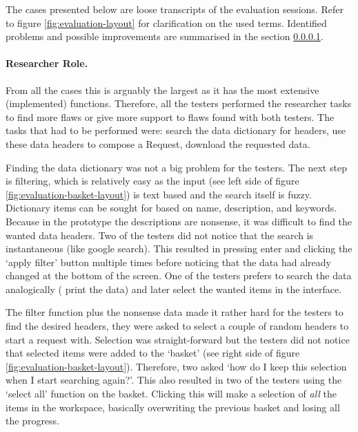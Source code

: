
The  cases presented below are loose transcripts of the evaluation sessions.
Refer to figure \ref{fig:evaluation-layout} for clarification on the used terms.
Identified problems and possible improvements are summarised in the  section \ref{}.

\paragraph{Researcher Role.}
From all the cases this is arguably the largest as it has the most extensive (implemented) functions.
Therefore, all the testers performed the researcher tasks to find more flaws or give more support to flaws found with both testers.
The tasks that had to be performed were: search the data dictionary for headers, use these data headers to compose a Request, download the requested data. 


Finding the data dictionary was not a big problem for the testers.
The next step is filtering, which is relatively easy as the input (see left side of figure \ref{fig:evaluation-basket-layout}) is text based and the search itself is fuzzy.
Dictionary items can be sought for based on name, description, and keywords.
Because in the prototype the descriptions are nonsense, it was difficult to find the wanted data headers.
Two of the testers did not notice that the search is instantaneous (like google search).
This resulted in pressing enter and clicking the `apply filter' button multiple times before noticing that the data had already changed at the bottom of the screen.
One of the testers prefers to search the data analogically (\ie{} print the data) and later select the wanted items in the interface.

The filter function plus the nonsense data made it rather hard for the testers to find the desired headers, they were asked to select a couple of random headers to start a request with.
Selection was straight-forward but the testers did not notice that selected items were added to the `basket' (see right side of figure \ref{fig:evaluation-basket-layout}).
Therefore, two asked `how do I keep this selection when I start searching again?'.
This also resulted in two of the testers using the `select all' function on the basket. 
Clicking this will make a selection of \emph{all} the items in the workspace, basically overwriting the previous basket and losing all the progress.

